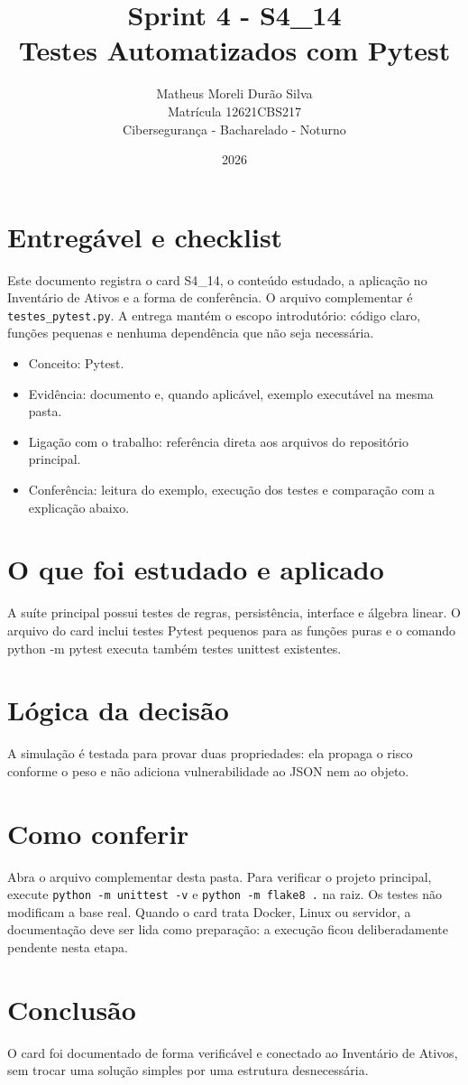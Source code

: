 \documentclass[12pt]{article}
\title{Sprint 4 - S4\_14\\Testes Automatizados com Pytest}
\author{Matheus Moreli Durão Silva\\ Matrícula 12621CBS217\\ Cibersegurança - Bacharelado - Noturno}
\date{2026}
\begin{document}
\maketitle

\section*{Entregável e checklist}
Este documento registra o card S4\_14, o conteúdo estudado, a aplicação no Inventário de Ativos e a forma de conferência. O arquivo complementar é \texttt{testes\_pytest.py}. A entrega mantém o escopo introdutório: código claro, funções pequenas e nenhuma dependência que não seja necessária.

\begin{itemize}
\item Conceito: Pytest.
\item Evidência: documento e, quando aplicável, exemplo executável na mesma pasta.
\item Ligação com o trabalho: referência direta aos arquivos do repositório principal.
\item Conferência: leitura do exemplo, execução dos testes e comparação com a explicação abaixo.
\end{itemize}

\section*{O que foi estudado e aplicado}
A suíte principal possui testes de regras, persistência, interface e álgebra linear. O arquivo do card inclui testes Pytest pequenos para as funções puras e o comando python -m pytest executa também testes unittest existentes.

\section*{Lógica da decisão}
A simulação é testada para provar duas propriedades: ela propaga o risco conforme o peso e não adiciona vulnerabilidade ao JSON nem ao objeto.

\section*{Como conferir}
Abra o arquivo complementar desta pasta. Para verificar o projeto principal, execute \texttt{python -m unittest -v} e \texttt{python -m flake8 .} na raiz. Os testes não modificam a base real. Quando o card trata Docker, Linux ou servidor, a documentação deve ser lida como preparação: a execução ficou deliberadamente pendente nesta etapa.

\section*{Conclusão}
O card foi documentado de forma verificável e conectado ao Inventário de Ativos, sem trocar uma solução simples por uma estrutura desnecessária.
\end{document}
